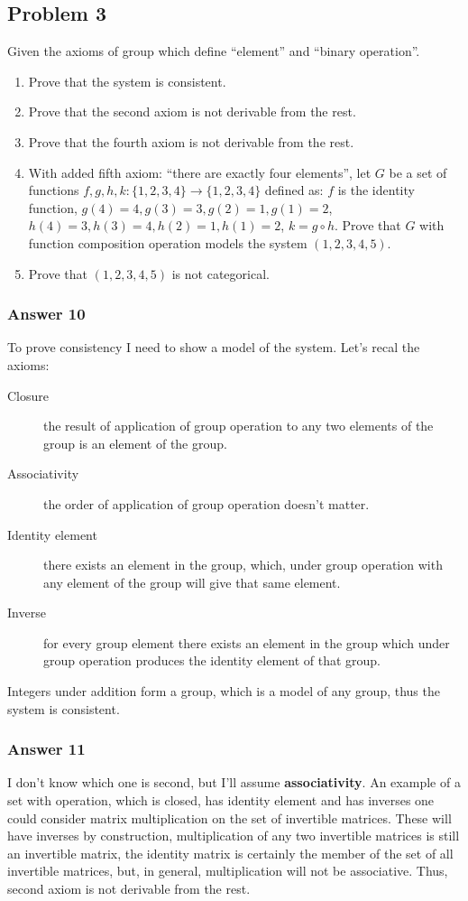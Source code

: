 \documentclass[11pt]{article}
\begin{document}
\subsection{Problem 3}
\label{sec-1-3}
Given the axioms of group which define ``element'' and ``binary operation''.
\begin{enumerate}
\item Prove that the system is consistent.
\item Prove that the second axiom is not derivable from the rest.
\item Prove that the fourth axiom is not derivable from the rest.
\item With added fifth axiom: ``there are exactly four elements'', 
let $G$ be a set of functions $f,g,h,k : \{1,2,3,4\}\to\{1,2,3,4\}$
defined as: $f$ is the identity function, $g(4)=4, g(3)=3, g(2)=1, g(1)=2$,
$h(4)=3, h(3)=4, h(2)=1, h(1)=2$, $k=g \circ h$.
Prove that $G$ with function composition operation models the system
$(1,2,3,4,5)$.
\item Prove that $(1,2,3,4,5)$ is not categorical.
\end{enumerate}

\subsubsection{Answer 10}
\label{sec-1-3-1}
To prove consistency I need to show a model of the system.  Let's
recal the axioms:
\begin{description}
\item[{Closure}] the result of application of group operation to any two
elements of the group is an element of the group.
\item[{Associativity}] the order of application of group operation doesn't
matter.
\item[{Identity element}] there exists an element in the group, which,
under group operation with any element of the group will give that
same element.
\item[{Inverse}] for every group element there exists an element in the
group which under group operation produces the identity element of
that group.
\end{description}

Integers under addition form a group, which is a model of any group,
thus the system is consistent.
\subsubsection{Answer 11}
\label{sec-1-3-2}
I don't know which one is second, but I'll assume \textbf{associativity}.
An example of a set with operation, which is closed, has identity element
and has inverses one could consider matrix multiplication on the set
of invertible matrices.  These will have inverses by construction,
multiplication of any two invertible matrices is still an invertible matrix,
the identity matrix is certainly the member of the set of all invertible
matrices, but, in general, multiplication will not be associative.
Thus, second axiom is not derivable from the rest.
\end{document}
